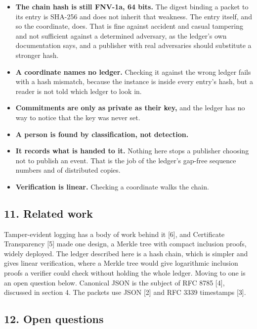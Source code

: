 \documentclass[
  12pt,
  letterpaper,
]{article}
\providecommand{\tightlist}{%
  \setlength{\itemsep}{0pt}\setlength{\parskip}{0pt}}
\begin{document}
\begin{itemize}
\tightlist
\item
  \textbf{The chain hash is still FNV-1a, 64 bits.} The digest binding a
  packet to its entry is SHA-256 and does not inherit that weakness. The
  entry itself, and so the coordinate, does. That is fine against
  accident and casual tampering and not sufficient against a determined
  adversary, as the ledger's own documentation says, and a publisher
  with real adversaries should substitute a stronger hash.
\item
  \textbf{A coordinate names no ledger.} Checking it against the wrong
  ledger fails with a hash mismatch, because the instance is inside
  every entry's hash, but a reader is not told which ledger to look in.
\item
  \textbf{Commitments are only as private as their key,} and the ledger
  has no way to notice that the key was never set.
\item
  \textbf{A person is found by classification, not detection.}
\item
  \textbf{It records what is handed to it.} Nothing here stops a
  publisher choosing not to publish an event. That is the job of the
  ledger's gap-free sequence numbers and of distributed copies.
\item
  \textbf{Verification is linear.} Checking a coordinate walks the
  chain.
\end{itemize}

\hypertarget{related-work}{%
\subsection{11. Related work}\label{related-work}}

Tamper-evident logging has a body of work behind it {[}6{]}, and
Certificate Transparency {[}5{]} made one design, a Merkle tree with
compact inclusion proofs, widely deployed. The ledger described here is
a hash chain, which is simpler and gives linear verification, where a
Merkle tree would give logarithmic inclusion proofs a verifier could
check without holding the whole ledger. Moving to one is an open
question below. Canonical JSON is the subject of RFC 8785 {[}4{]},
discussed in section 4. The packets use JSON {[}2{]} and RFC 3339
timestamps {[}3{]}.

\hypertarget{open-questions}{%
\subsection{12. Open questions}\label{open-questions}}
\end{document}

